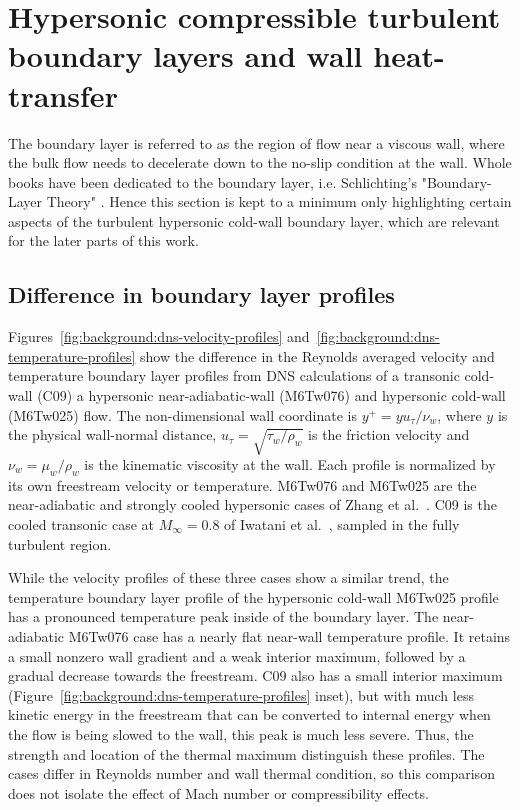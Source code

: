 \section{Hypersonic compressible turbulent boundary layers and wall heat-transfer}
\label{sec:background:turbulent-boundary-layers-wall-heat-transfer}

The boundary layer is referred to as the region of flow near a viscous wall, where the bulk flow needs to decelerate down to the no-slip condition at the wall. Whole books have been dedicated to the boundary layer, i.e. Schlichting's "Boundary-Layer Theory" \cite{SchlichtingGersten2017BoundaryLayer}. Hence this section is kept to a minimum only highlighting certain aspects of the turbulent hypersonic cold-wall boundary layer, which are relevant for the later parts of this work.

\subsection{Difference in boundary layer profiles}
\label{subsec:background:wall-units}


Figures~\ref{fig:background:dns-velocity-profiles} and~\ref{fig:background:dns-temperature-profiles} show the difference in the Reynolds averaged velocity and temperature boundary layer profiles from DNS calculations of a transonic cold-wall (C09) a hypersonic near-adiabatic-wall (M6Tw076) and hypersonic cold-wall (M6Tw025) flow. The non-dimensional wall coordinate is \(y^+=y u_\tau/\nu_w\), where \(y\) is the physical wall-normal distance, \(u_\tau=\sqrt{\tau_w/\rho_w}\) is the friction velocity and \(\nu_w=\mu_w/\rho_w\) is the kinematic viscosity at the wall. Each profile is normalized by its own freestream velocity or temperature. M6Tw076 and M6Tw025 are the near-adiabatic and strongly cooled hypersonic cases of Zhang et al.~\cite{zhang2018direct}. C09 is the cooled transonic case at \(M_\infty=0.8\) of Iwatani et al.~\cite{iwatani2025subharmonic}, sampled in the fully turbulent region.
\par\medskip

While the velocity profiles of these three cases show a similar trend, the temperature boundary layer profile of the hypersonic cold-wall M6Tw025 profile has a pronounced temperature peak inside of the boundary layer. The near-adiabatic M6Tw076 case has a nearly flat near-wall temperature profile. It retains a small nonzero wall gradient and a weak interior maximum, followed by a gradual decrease towards the freestream. C09 also has a small interior maximum (Figure~\ref{fig:background:dns-temperature-profiles} inset), but with much less kinetic energy in the freestream that can be converted to internal energy when the flow is being slowed to the wall, this peak is much less severe. Thus, the strength and location of the thermal maximum distinguish these profiles. The cases differ in Reynolds number and wall thermal condition, so this comparison does not isolate the effect of Mach number or compressibility effects.

